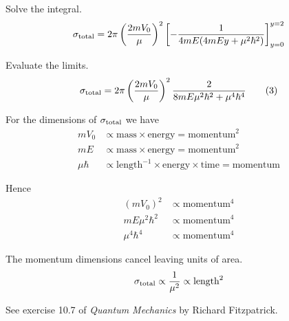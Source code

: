 Solve the integral.
\begin{equation*}
\sigma_{\rm total}=2\pi\left(\frac{2mV_0}{\mu}\right)^2
\left[-\frac{1}{4mE(4mEy+\mu^2\hbar^2)}\right]_{y=0}^{y=2}
\end{equation*}

Evaluate the limits.
\begin{equation*}
\sigma_{\rm total}=2\pi\left(\frac{2mV_0}{\mu}\right)^2
\frac{2}{8mE\mu^2\hbar^2+\mu^4\hbar^4}
\tag{3}
\end{equation*}

For the dimensions of $\sigma_{\rm total}$ we have
\begin{align*}
mV_0&\propto\text{mass}\times\text{energy}=\text{momentum}^2
\\
mE&\propto\text{mass}\times\text{energy}=\text{momentum}^2
\\
\mu\hbar&\propto\text{length}^{-1}\times\text{energy}\times\text{time}=\text{momentum}
\end{align*}

Hence
\begin{align*}
(mV_0)^2&\propto\text{momentum}^4
\\
mE\mu^2\hbar^2&\propto\text{momentum}^4
\\
\mu^4\hbar^4&\propto\text{momentum}^4
\end{align*}

The momentum dimensions cancel leaving units of area.
\begin{equation*}
\sigma_{\rm total}\propto\frac{1}{\mu^2}\propto\text{length}^2
\end{equation*}

See exercise 10.7 of {\it Quantum Mechanics} by Richard Fitzpatrick.


